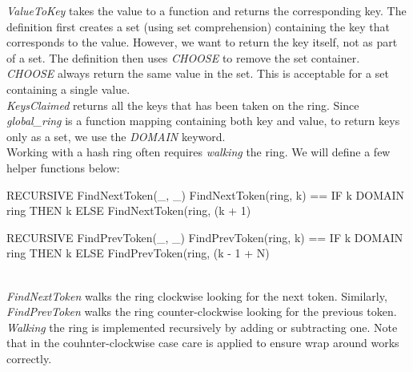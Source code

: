 \textit{ValueToKey} takes the value to a function and returns the corresponding
key. The definition first creates a set (using set comprehension) containing the
key that corresponds to the value. However, we want to return the key itself,
not as part of a set. The definition then uses \textit{CHOOSE} to remove the set
container. \textit{CHOOSE} always return the same value in the set. This is
acceptable for a set containing a single value.\\

\textit{KeysClaimed} returns all the keys that has been taken on the ring. Since
\textit{global\_ring} is a function mapping containing both key and value, to
return keys only as a set, we use the \textit{DOMAIN} keyword.\\

Working with a hash ring often requires \textit{walking} the ring.  We will
define a few helper functions below:

\begin{tla}
RECURSIVE FindNextToken(_, _)
FindNextToken(ring, k) ==
    IF k \in DOMAIN ring THEN
        k 
    ELSE 
        FindNextToken(ring, (k + 1) %

RECURSIVE FindPrevToken(_, _)
FindPrevToken(ring, k) ==
    IF k \in DOMAIN ring THEN
        k
    ELSE 
        FindPrevToken(ring, (k - 1 + N) %
\end{tla}
\begin{tlatex}
%
%
%
%
%
%
\@pvspace{8.0pt}%
%
%
%
%
%
%
\end{tlatex}
\\

\textit{FindNextToken} walks the ring clockwise looking for the next token.
Similarly, \textit{FindPrevToken} walks the ring counter-clockwise looking for the
previous token. \textit{Walking} the ring is implemented recursively by adding or 
subtracting one. Note that in the couhnter-clockwise case care is applied to
ensure wrap around works correctly.\\

